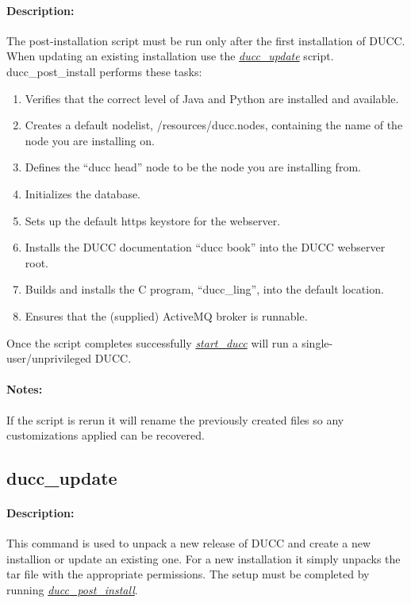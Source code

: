     \paragraph{Description:}
    The post-installation script must be run only after the first installation of DUCC. 
    When updating an existing installation use the \hyperref[subsec:admin.ducc-update]{\em ducc\_update}
    script.
    ducc\_post\_install performs these tasks:
    \begin{enumerate}
      \item Verifies that the correct level of Java and Python are installed and available.
      \item Creates a default nodelist, \duccruntime/resources/ducc.nodes, containing the name of the node you are installing on.
      \item Defines the ``ducc head'' node to be the node you are installing from.
      \item Initializes the database.
      \item Sets up the default https keystore for the webserver.
      \item Installs the DUCC documentation ``ducc book'' into the DUCC webserver root.
      \item Builds and installs the C program, ``ducc\_ling'', into the default location.
      \item Ensures that the (supplied) ActiveMQ broker is runnable.
    \end{enumerate}

    Once the script completes successfully \hyperref[subsec:admin.start-ducc]{\em start\_ducc} will run a single-user/unprivileged DUCC.

    \paragraph{Notes:}
    If the script is rerun it will rename the previously created files so any customizations applied
    can be recovered.

\subsection{ducc\_update}
\label{subsec:admin.ducc-update}

    \paragraph{Description:}
        This command is used to unpack a new release of DUCC and create a new installion or update
        an existing one.
        For a new installation it simply unpacks the tar file with the appropriate permissions.
        The setup must be completed by running \hyperref[subsec:admin.ducc-post-install]{\em ducc\_post\_install}.


